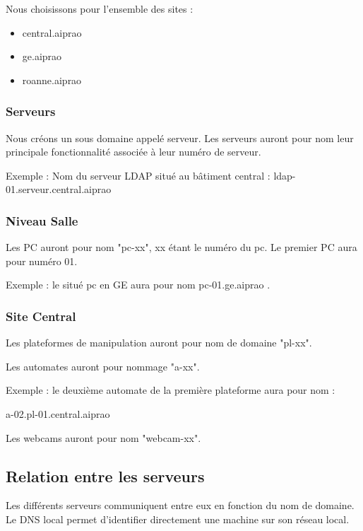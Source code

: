 Nous choisissons pour l'ensemble des sites : 
\begin{itemize}
\item central.aiprao
\item ge.aiprao
\item roanne.aiprao
\end{itemize}

\subsubsection{Serveurs}

Nous créons un sous domaine appelé serveur. Les serveurs auront pour nom leur 
principale fonctionnalité associée à leur numéro de serveur. 

Exemple : Nom du serveur LDAP situé au bâtiment central : ldap-01.serveur.central.aiprao

\subsubsection{Niveau Salle}

Les PC auront pour nom "pc-xx", xx étant le numéro du pc. Le premier PC aura 
pour numéro 01.

Exemple : le situé pc en GE aura pour nom pc-01.ge.aiprao .

\subsubsection{Site Central}

Les plateformes de manipulation auront pour nom de domaine "pl-xx".

Les automates auront pour nommage "a-xx". 

Exemple : le deuxième automate de la première plateforme aura pour nom : 

a-02.pl-01.central.aiprao

Les webcams auront pour nom "webcam-xx".

\subsection{Relation entre les serveurs}

Les différents serveurs communiquent entre eux en fonction du nom de domaine. 
Le DNS local permet d'identifier directement une machine sur son réseau local.

